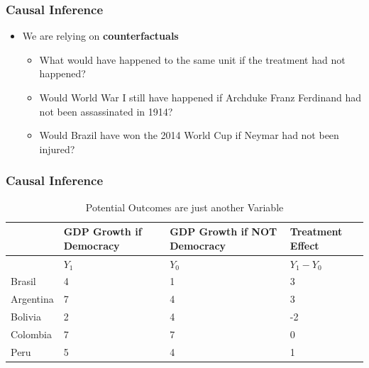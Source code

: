\documentclass[xcolor=x11names,compress]{beamer}\usepackage[]{graphicx}\usepackage[]{color}
\renewcommand{\(}{\begin{columns}}
\renewcommand{\)}{\end{columns}}
\newcommand{\<}[1]{\begin{column}{#1}}
\renewcommand{\>}{\end{column}}
\begin{document}
\begin{frame}
\frametitle{Causal Inference}
\begin{itemize}
\item We are relying on \textbf{counterfactuals}
\pause
\begin{itemize}
\item What would have happened to the same unit if the treatment had not happened?
\pause
\item Would World War I still have happened if Archduke Franz Ferdinand had not been assassinated in 1914?
\pause
\item Would Brazil have won the 2014 World Cup if Neymar had not been injured?
\pause
\end{itemize}
\end{itemize}
\end{frame}


\begin{frame}
\frametitle{Causal Inference}
\footnotesize
\begin{table}[htbp]
  \centering
  \caption{Potential Outcomes are just another Variable}
    \begin{tabular}{|p{2.4cm}|p{2.4cm}|p{2.4cm}|p{2.4cm}|}
    \hline
          & \multicolumn{1}{p{2.4cm}|}{GDP Growth if Democracy} & \multicolumn{1}{p{2.4cm}|}{GDP Growth if  NOT Democracy} &  Treatment Effect\bigstrut\\
    \hline
          & \multicolumn{1}{l|}{$Y_1$} & \multicolumn{1}{l|}{$Y_0$} & \multicolumn{1}{l|}{$Y_1-Y_0$} \bigstrut\\
    \hline
    Brasil & 4     & 1     & 3 \bigstrut\\
    \hline
    Argentina & 7    & 4     & 3 \bigstrut\\
    \hline
    Bolivia & 2     & 4     & -2 \bigstrut\\
    \hline
    Colombia & 7    & 7    & 0 \bigstrut\\
    \hline
    Peru & 5     & 4     & 1 \bigstrut\\
    \hline
    \end{tabular}%
  \label{tab:addlabel}%
\end{table}%
\normalsize
\end{frame}
\end{document}
